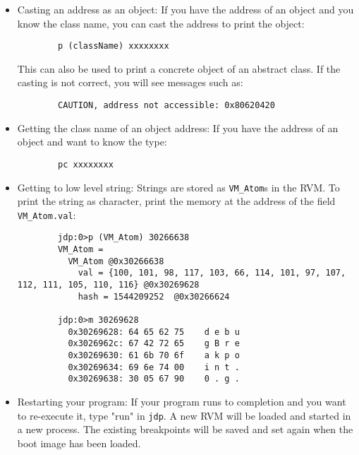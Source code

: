 \begin{itemize}
\item Casting an address as an object:
  If you have the address of an object and you know the class name,
  you can cast the address to print the object:
\begin{verbatim}
        p (className) xxxxxxxx
\end{verbatim}
  This can also be used to print a concrete object of an abstract class.
  If the casting is not correct, you will see messages such as:
\begin{verbatim}
        CAUTION, address not accessible: 0x80620420
\end{verbatim}


\item Getting the class name of an object address:
  If you have the address of an object and want to know the type:
\begin{verbatim}
        pc xxxxxxxx
\end{verbatim}


\item Getting to low level string:
  Strings are stored as {\tt VM\_Atom}s in the RVM.     
  To print the string as character, print the memory at the address of
  the field {\tt VM\_Atom.val}:

\begin{verbatim}
        jdp:0>p (VM_Atom) 30266638
        VM_Atom = 
          VM_Atom @0x30266638
            val = {100, 101, 98, 117, 103, 66, 114, 101, 97, 107, 112, 111, 105, 110, 116} @0x30269628
            hash = 1544209252  @0x30266624

        jdp:0>m 30269628
          0x30269628: 64 65 62 75    d e b u
          0x3026962c: 67 42 72 65    g B r e
          0x30269630: 61 6b 70 6f    a k p o
          0x30269634: 69 6e 74 00    i n t .
          0x30269638: 30 05 67 90    0 . g .
\end{verbatim}


\item Restarting your program:
  If your program runs to completion and you want to re-execute it,
  type "run" in {\tt jdp}.  A new RVM will be loaded and started in a new
  process.  The existing breakpoints will be saved and set again 
  when the boot image has been loaded.



\end{itemize}
